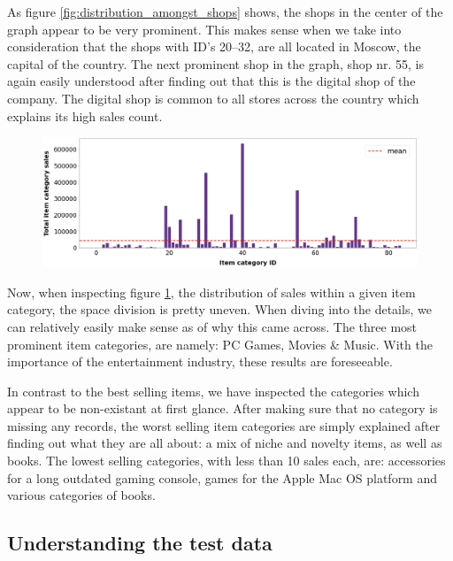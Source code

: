 As figure \ref{fig:distribution_amongst_shops} shows, the shops in the center of the graph appear to be very prominent. This makes sense when we take into consideration that the shops with ID's 20--32, are all located in Moscow, the capital of the country.
The next prominent shop in the graph, shop nr. 55, is again easily understood after finding out that this is the digital shop of the company. The digital shop is common to all stores across the country which explains its high sales count.

\begin{figure}[h]
  \centering
  \includegraphics[width=0.9\linewidth]{external_content/graphs/distribution_across_item_categories.png}
  \captionsetup{justification=centering}
  \label{fig:distribution_amongst_item_categories}
\end{figure}

Now, when inspecting figure \ref{fig:distribution_amongst_item_categories}, the distribution of sales within a given item category, the space division is pretty uneven. When diving into the details, we can relatively easily make sense as of why this came across.
The three most prominent item categories, are namely: PC Games, Movies \& Music. With the importance of the entertainment industry, these results are foreseeable.

In contrast to the best selling items, we have inspected the categories which appear to be non-existant at first glance. After making sure that no category is missing any records, the worst selling item categories are simply explained after finding out what they are all about: a mix of niche and novelty items, as well as books. The lowest selling categories, with less than 10 sales each, are: accessories for a long outdated gaming console, games for the Apple Mac OS platform and various categories of books.

\subsection{Understanding the test data} \label{sec:testdata}

